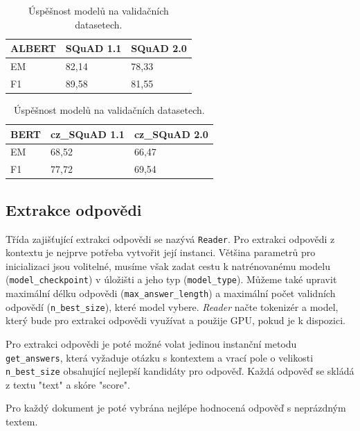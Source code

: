 \begin{table}[h]
\centering
    \begin{tabular}{| l | l | l |}
        \hline
        \textbf{ALBERT} & SQuAD 1.1 & SQuAD 2.0 \\ \hline
        EM              & 82,14      & 78,33      \\ \hline
        F1              & 89,58      & 81,55      \\ \hline
    \end{tabular}
    \begin{tabular}{| l | l | l |}
        \hline
        \textbf{BERT} & cz\_SQuAD 1.1 & cz\_SQuAD 2.0 \\ \hline
        EM              & 68,52      & 66,47      \\ \hline
        F1              & 77,72      & 69,54      \\ \hline
    \end{tabular}
    \caption{
    Úspěšnost modelů na validačních datasetech.
    }
    \label{tab:reader_trained}
\end{table}

\subsection{Extrakce odpovědi}
Třída zajišťující extrakci odpovědi se nazývá \texttt{Reader}. Pro extrakci odpovědi z kontextu je nejprve potřeba vytvořit její instanci. Většina parametrů pro inicializaci jsou volitelné, musíme však zadat cestu k natrénovanému modelu (\texttt{model\_checkpoint}) v úložišti a jeho typ (\texttt{model\_type}). Můžeme také upravit maximální délku odpovědi (\texttt{max\_answer\_length}) a maximální počet validních odpovědí (\texttt{n\_best\_size}), které model vybere. \emph{Reader} načte tokenizér a model, který bude pro extrakci odpovědi využívat a použije GPU, pokud je k dispozici.\par
Pro extrakci odpovědi je poté možné volat jedinou instanční metodu \texttt{get\_answers}, která vyžaduje otázku s kontextem a vrací pole o velikosti \texttt{n\_best\_size} obsahující nejlepší kandidáty pro odpověď. Každá odpověď se skládá z textu "text" a skóre "score".\par
Pro každý dokument je poté vybrána nejlépe hodnocená odpověď s neprázdným textem.

